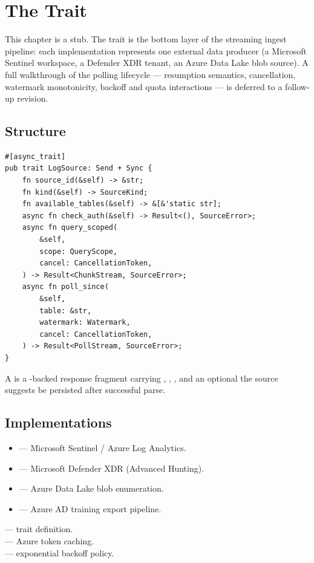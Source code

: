 \chapter{The  Trait}
\label{ch:logsource}

\begin{note}
This chapter is a stub. The  trait is the bottom
layer of the streaming ingest pipeline: each implementation
represents one external data producer (a Microsoft Sentinel
workspace, a Defender XDR tenant, an Azure Data Lake blob source).
A full walkthrough of the polling lifecycle --- 
resumption semantics, cancellation, watermark monotonicity,
backoff and quota interactions --- is deferred to a follow-up
revision.
\end{note}

\section{Structure}

\begin{lstlisting}[style=rust]
#[async_trait]
pub trait LogSource: Send + Sync {
    fn source_id(&self) -> &str;
    fn kind(&self) -> SourceKind;
    fn available_tables(&self) -> &[&'static str];
    async fn check_auth(&self) -> Result<(), SourceError>;
    async fn query_scoped(
        &self,
        scope: QueryScope,
        cancel: CancellationToken,
    ) -> Result<ChunkStream, SourceError>;
    async fn poll_since(
        &self,
        table: &str,
        watermark: Watermark,
        cancel: CancellationToken,
    ) -> Result<PollStream, SourceError>;
}
\end{lstlisting}

A  is a -backed response fragment
carrying , , , and
an optional  the source suggests be
persisted after successful parse.

\section{Implementations}

\begin{itemize}
    \item {}
          --- Microsoft Sentinel / Azure Log Analytics.
    \item {}
          --- Microsoft Defender XDR (Advanced Hunting).
    \item {}
          --- Azure Data Lake blob enumeration.
    \item {}
          --- Azure AD training export pipeline.
\end{itemize}

\begin{inthecode}
 --- trait
definition.\\
 ---
Azure token caching.\\
 --- exponential
backoff policy.
\end{inthecode}
